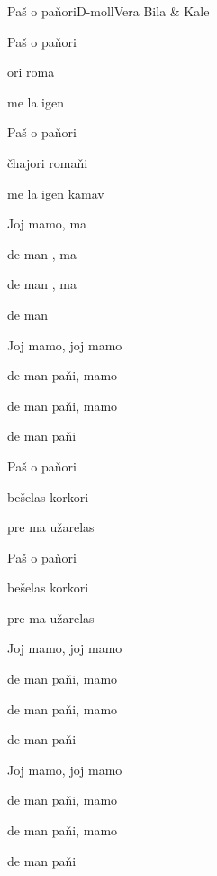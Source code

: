\begin{song}{Paš o paňori}{D-moll}{}{Vera Bila \& Kale}{}{}

\begin{SBVerse}
	Paš o paňori

	ori roma

	me la igen 

	Paš o paňori

	čhajori romaňi

	me la igen kamav
\end{SBVerse}

\begin{SBChorus}
	Joj mamo,  ma

	de man , ma

	de man , ma

	de man 

	Joj mamo, joj mamo

	de man paňi, mamo

	de man paňi, mamo

	de man paňi
\end{SBChorus}

\begin{SBVerse}
	Paš o paňori

	bešelas korkori

	pre ma užarelas

	Paš o paňori

	bešelas korkori

	pre ma užarelas
\end{SBVerse}

\begin{SBChorus}
	Joj mamo, joj mamo

	de man paňi, mamo

	de man paňi, mamo

	de man paňi

	Joj mamo, joj mamo

	de man paňi, mamo

	de man paňi, mamo

	de man paňi
\end{SBChorus}

\end{song}

